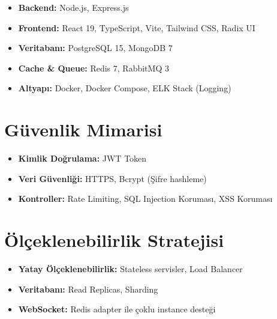 \begin{itemize}
    \item \textbf{Backend:} Node.js, Express.js
    \item \textbf{Frontend:} React 19, TypeScript, Vite, Tailwind CSS, Radix UI
    \item \textbf{Veritabanı:} PostgreSQL 15, MongoDB 7
    \item \textbf{Cache \& Queue:} Redis 7, RabbitMQ 3
    \item \textbf{Altyapı:} Docker, Docker Compose, ELK Stack (Logging)
\end{itemize}

\section{Güvenlik Mimarisi}
\begin{itemize}
    \item \textbf{Kimlik Doğrulama:} JWT Token
    \item \textbf{Veri Güvenliği:} HTTPS, Bcrypt (Şifre hashleme)
    \item \textbf{Kontroller:} Rate Limiting, SQL Injection Koruması, XSS Koruması
\end{itemize}

\section{Ölçeklenebilirlik Stratejisi}
\begin{itemize}
    \item \textbf{Yatay Ölçeklenebilirlik:} Stateless servisler, Load Balancer
    \item \textbf{Veritabanı:} Read Replicas, Sharding
    \item \textbf{WebSocket:} Redis adapter ile çoklu instance desteği
\end{itemize}
